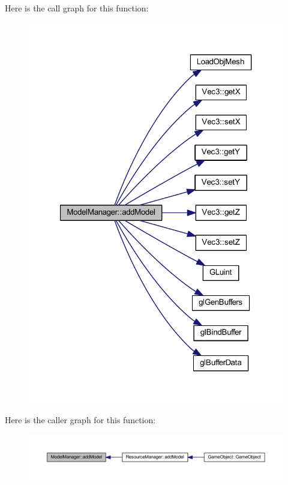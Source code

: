Here is the call graph for this function\+:\nopagebreak
\begin{figure}[H]
\begin{center}
\leavevmode
\includegraphics[width=321pt]{d3/d3a/class_model_manager_a95cf305712d097d0ff9cb96a2b71f9cd_cgraph}
\end{center}
\end{figure}




Here is the caller graph for this function\+:\nopagebreak
\begin{figure}[H]
\begin{center}
\leavevmode
\includegraphics[width=350pt]{d3/d3a/class_model_manager_a95cf305712d097d0ff9cb96a2b71f9cd_icgraph}
\end{center}
\end{figure}


